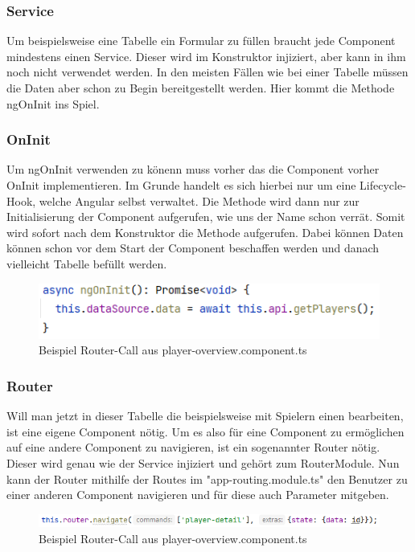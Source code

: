 \subsubsection{Service}
Um beispielsweise eine Tabelle ein Formular zu füllen braucht jede Component mindestens einen Service. Dieser wird im Konstruktor injiziert, aber kann in ihm noch nicht verwendet werden. In den meisten Fällen wie bei einer Tabelle müssen die 
Daten aber schon zu Begin bereitgestellt werden. Hier kommt die Methode ngOnInit ins Spiel.

\subsubsection{OnInit}
Um ngOnInit verwenden zu könenn muss vorher das die Component vorher OnInit implementieren. Im Grunde handelt es sich hierbei nur um eine Lifecycle-Hook, welche Angular selbst verwaltet.
Die Methode wird dann nur zur Initialisierung der Component aufgerufen, wie uns der Name schon verrät. Somit wird sofort nach dem Konstruktor die Methode aufgerufen. Dabei können Daten können schon vor dem Start der Component beschaffen werden und danach vielleicht Tabelle befüllt werden. \cite{implementation-angular-5}

\begin{figure}[H]
    \includegraphics[scale=0.8]{pics/frontend/example_ngOnInit.PNG}
    \caption{Beispiel Router-Call aus player-overview.component.ts}
\end{figure}
\subsubsection{Router}
Will man jetzt in dieser Tabelle die beispielsweise mit Spielern einen bearbeiten, ist eine eigene Component nötig. Um es also für eine Component zu ermöglichen auf eine andere Component zu navigieren, ist ein sogenannter Router nötig. Dieser wird genau wie der Service injiziert und gehört zum RouterModule. 
Nun kann der Router mithilfe der Routes im "app-routing.module.ts" den Benutzer zu einer anderen Component navigieren und für diese auch Parameter mitgeben.

\begin{figure}[H]
    \includegraphics[scale=1]{pics/frontend/example_navigation.PNG}
    \caption{Beispiel Router-Call aus player-overview.component.ts}
\end{figure}

